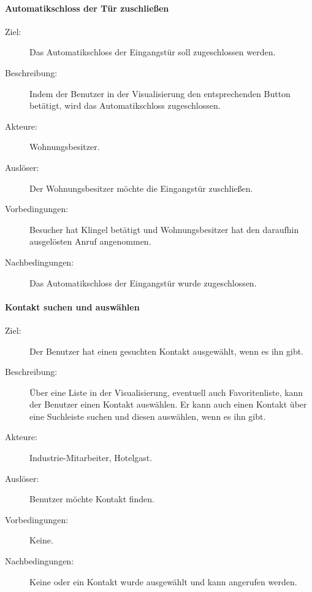 \paragraph{Automatikschloss der Tür zuschließen}
    \begin{description}
        \item[Ziel:] Das Automatikschloss der Eingangstür soll zugeschlossen werden.
        \item[Beschreibung:] Indem der Benutzer in der Visualisierung den entsprechenden Button betätigt, wird das Automatikschloss zugeschlossen.
        \item[Akteure:] Wohnungsbesitzer.
        \item[Auslöser:] Der Wohnungsbesitzer möchte die Eingangstür zuschließen.
        \item[Vorbedingungen:] Besucher hat Klingel betätigt und Wohnungsbesitzer hat den daraufhin ausgelösten Anruf angenommen.
        \item[Nachbedingungen:] Das Automatikschloss der Eingangstür wurde zugeschlossen.
    \end{description}

\paragraph{Kontakt suchen und auswählen}
    \begin{description}
        \item[Ziel:] Der Benutzer hat einen gesuchten Kontakt ausgewählt, wenn es ihn gibt.
        \item[Beschreibung:] Über eine Liste in der Visualisierung, eventuell auch Favoritenliste, kann der Benutzer einen Kontakt auswählen.
            Er kann auch einen Kontakt über eine Suchleiste suchen und diesen auswählen, wenn es ihn gibt.
        \item[Akteure:] Industrie-Mitarbeiter, Hotelgast.
        \item[Auslöser:] Benutzer möchte Kontakt finden.
        \item[Vorbedingungen:] Keine.
        \item[Nachbedingungen:] Keine oder ein Kontakt wurde ausgewählt und kann angerufen werden.
    \end{description}

